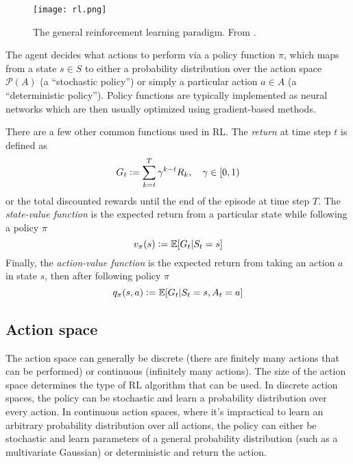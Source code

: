 \begin{figure}[H]
    \centering
    \texttt{[image: rl.png]}
    \caption{The general reinforcement learning paradigm. From \cite{sutton2018reinforcement}.}
    \label{fig:RL}
\end{figure}

The agent decides what actions to perform via a policy function $\pi$, which maps from a state $s \in S$ to either a probability distribution over the action space $\mathcal{P}(A)$ (a ``stochastic policy'') or simply a particular action $a \in A$ (a ``deterministic policy''). Policy functions are typically implemented as neural networks which are then usually optimized using gradient-based methods.

There are a few other common functions used in RL. The \emph{return} at time step $t$ is defined as
\begin{equation}\label{eq:return}
    G_t \mathrel{\mathop:}= \sum_{k=t}^T \gamma^{k-t} R_k, \quad \gamma \in [0,1)
\end{equation}
or the total discounted rewards until the end of the episode at time step $T$. The \emph{state-value function} is the expected return from a particular state while following a policy $\pi$
\begin{equation}\label{eq:state_value}
    v_\pi(s) \mathrel{\mathop:}= \mathbb E[G_t | S_t = s]
\end{equation}
Finally, the \emph{action-value function} is the expected return from taking an action $a$ in state $s$, then after following policy $\pi$
\begin{equation}\label{eq:action_value}
    q_\pi(s, a) \mathrel{\mathop:}= \mathbb E[G_t | S_t = s, A_t = a]
\end{equation}

\subsection{Action space}

The action space can generally be discrete (there are finitely many actions that can be performed) or continuous  (infinitely many actions). The size of the action space determines the type of RL algorithm that can be used. In discrete action spaces, the policy can be stochastic and learn a probability distribution over every action. In continuous action spaces, where it's impractical to learn an arbitrary probability distribution over all actions, the policy can either be stochastic and learn parameters of a general probability distribution (such as a multivariate Gaussian) or deterministic and return the action.

